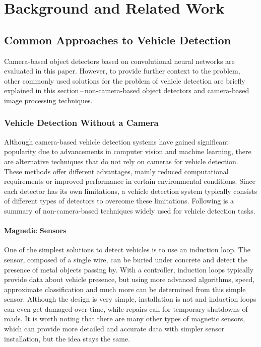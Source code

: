 


\chapter{Background and Related Work}


\section{Common Approaches to Vehicle Detection}

Camera-based object detectors based on convolutional neural networks are
evaluated in this paper. However, to provide further context to the problem,
other commonly used solutions for the problem of vehicle detection are briefly
explained in this section\,--\,non-camera-based object detectors and
camera-based image processing techniques.


\subsection{Vehicle Detection Without a Camera}

Although camera-based vehicle detection systems have gained significant
popularity due to advancements in computer vision and machine learning, there
are alternative techniques that do not rely on cameras for vehicle detection.
These methods offer different advantages, mainly reduced computational
requirements or improved performance in certain environmental conditions. Since
each detector has its own limitations, a vehicle detection system typically
consists of different types of detectors to overcome these limitations.
Following is a summary of non-camera-based techniques widely used for vehicle
detection tasks.


\subsubsection*{Magnetic Sensors}

One of the simplest solutions to detect vehicles is to use an induction
loop.\cite{MagneticSensors} The sensor, composed of a single wire, can be buried
under concrete and detect the presence of metal objects passing by. With a
controller, induction loops typically provide data about vehicle presence, but
using more advanced algorithms, speed, approximate classification and much more
can be determined from this simple sensor. Although the design is very simple,
installation is not and induction loops can even get damaged over time, while
repairs call for temporary shutdowns of roads. It is worth noting that there
are many other types of magnetic sensors, which can provide more detailed and
accurate data with simpler sensor installation, but the idea stays the same.


